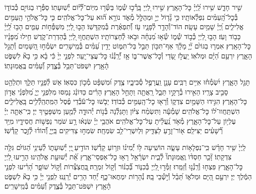 \documentclass[twoside, openany, parskip=half, 11pt]{book}
\begin{document}
שִׁ֣יר חָדָ֑שׁ שִׁ֥ירוּ לַֽ֝יְיָ֗ כׇּל־הָאָֽרֶץ׃
שִׁ֣ירוּ לַ֭יְיָ בָּֽרְ֯כ֣וּ שְׁ֯מ֑וֹ בַּשְּׂ֯ר֥וּ מִיּֽוֹם־לְ֝֯י֗וֹם יְ֯שֽׁוּעָתֽוֹ׃
סַפְּ֯ר֣וּ בַגּוֹיִ֣ם כְּ֯בוֹד֑וֹ בְּ֯כׇל־הָֽ֝עַמִּ֗ים נִפְלְ֯אוֹתָֽיו׃
כִּ֥י גָ֘ד֤וֹל יְיָ֣ וּמְהֻלָּ֣ל מְ֯אֹ֑ד נוֹרָ֥א ה֝֗וּא עַל־כׇּל־אֱלֹהִֽים׃
כִּ֤י כׇּל־אֱלֹהֵ֣י הָֽעַמִּ֣ים אֱלִילִ֑ים וַֽ֝יְיָ֗ שָׁמַ֥יִם עָשָֽׂה׃
הוֹד־וְ֯הָדָ֥ר לְ֯פָנָ֑יו עֹ֥ז וְ֝֯תִפְאֶ֗רֶת בְּ֯מִקְדָּשֽׁוֹ׃
הָב֣וּ לַ֭יְיָ מִשְׁפְּ֯ח֣וֹת עַמִּ֑ים הָב֥וּ לַֽ֝יְיָ֗ כָּב֥וֹד וָעֹֽז׃
הָב֣וּ לַ֭יְיָ כְּ֯ב֣וֹד שְׁ֯מ֑וֹ שְׂ֯א֥וּ מִ֝נְחָ֗ה וּבֹ֥אוּ לְ֯חַצְרוֹתָֽיו׃
הִשְׁתַּֽחֲו֣וּ לַ֭יְיָ בְּ֯הַדְרַת־קֹ֑דֶשׁ חִ֥ילוּ מִ֝פָּנָ֗יו כׇּל־הָאָֽרֶץ׃
אִמְר֤וּ בַגּוֹיִ֨ם יְ֘יָ֤ מָלָ֗ךְ אַף־תִּכּ֣וֹן תֵּבֵ֣ל בַּל־תִּמּ֑וֹט יָדִ֥ין עַ֝מִּ֗ים בְּ֯מֵֽישָׁרִֽים׃
יִשְׂמְ֯ח֣וּ הַ֭שָּׁמַיִם וְ֯תָגֵ֣ל הָאָ֑רֶץ יִרְעַ֥ם הַ֝יָּ֗ם וּמְלֹאֽוֹ׃
יַֽעֲלֹ֣ז שָׂ֭דַי וְ֯כׇל־אֲשֶׁר־בּ֑וֹ אָ֥ז יְ֝֯רַֽנְ֯נ֗וּ כׇּל־עֲצֵי־יָֽעַר׃
לִפְנֵ֤י יְיָ֨ כִּ֬י בָ֗א כִּ֥י בָא֘ לִשְׁפֹּ֢ט הָ֫אָ֥רֶץ יִשְׁפֹּט־תֵּבֵ֥ל בְּ֯צֶ֑דֶק וְ֝֯עַמִּ֗ים בֶּֽאֱמֽוּנָתֽוֹ׃

תָּגֵ֣ל הָאָ֑רֶץ יִ֝שְׂמְ֯ח֗וּ אִיִּ֥ים רַבִּֽים׃
עָנָ֣ן וַֽעֲרָפֶ֣ל סְ֯בִיבָ֑יו צֶ֥דֶק וּ֝מִשְׁפָּ֗ט מְ֯כ֣וֹן כִּסְאֽוֹ׃
אֵשׁ לְ֯פָנָ֣יו תֵּלֵ֑ךְ וּתְלַהֵ֖ט סָבִ֣יב צָרָֽיו׃
הֵאִ֣ירוּ בְ֯רָקָ֣יו תֵּבֵ֑ל רָֽאֲתָ֖ה וַתָּחֵ֣ל הָאָֽרֶץ׃
הָרִ֗ים כַּדּוֹנַ֗ג נָמַסּוּ מִלִּפְנֵ֣י יְיָ֑ מִ֝לִּפְנֵ֗י אֲד֣וֹן כׇּל־הָאָֽרֶץ׃
הִגִּ֣ידוּ הַשָּׁמַ֣יִם צִדְק֑וֹ וְ֯רָא֖וּ כׇל־הָֽעַמִּ֣ים כְּ֯בוֹדֽוֹ׃
יֵבֹ֤שׁוּ כׇּל־עֹ֬בְ֯דֵי פֶ֗סֶל הַמִּֽתְהַֽלְ֯לִ֥ים בָּֽאֱלִילִ֑ים הִשְׁתַּֽחֲווּ־ל֝וֹ כׇּל־אֱלֹהִֽים׃
שָׁמְ֯עָ֬ה וַתִּשְׂמַ֨ח צִיּ֗וֹן וַתָּגֵלְ֯נָה בְּ֯נ֣וֹת יְ֯הוּדָ֑ה לְ֯מַ֖עַן מִשְׁפָּטֶ֣יךָ יְיָ׃
כִּֽי־אַתָּ֤ה יְיָ֗ עֶלְי֥וֹן עַל־כׇּל־הָאָ֑רֶץ מְ֯אֹ֥ד נַֽ֝עֲלֵ֗יתָ עַל־כׇּל־אֱלֹהִֽים׃
אֹהֲבֵ֥י יְיָ֗ שִׂנְא֫וּ רָ֥ע שֹׁמֵר נַפְשׁ֣וֹת חֲסִידָ֑יו מִיַּ֥ד רְ֝֯שָׁעִ֗ים יַצִּילֵֽם׃
א֖וֹר־זָרֻ֣עַ לַצַּדִּ֑יק וּֽלְיִשְׁרֵי־לֵ֥ב שִׂמְחָֽה׃
שִׂמְח֣וּ צַדִּיקִים בַּֽיְיָ֑ וְ֝֯הוֹד֗וּ לְ֯זֵ֣כֶר קָדְ֯שֽׁוֹ׃


לַֽיְיָ֙ שִׁ֥יר חָדָ֗שׁ כִּֽי־נִפְלָא֥וֹת עָשָׂ֑ה הוֹשִֽׁיעָה לּ֥וֹ יְ֝֯מִינ֗וֹ וּזְר֥וֹעַ קָדְ֯שֽׁוֹ׃
הוֹדִ֣יעַ ֖יְיָ יְ֯שֽׁוּעָת֑וֹ לְ֯עֵינֵ֥י הַ֝גּוֹיִ֗ם גִּלָּ֥ה צִדְקָתֽוֹ׃
זָ֘כַ֤ר חַסְדּ֨וֹ וֶֽאֱמֽוּנָתוֹ֘ לְ֯בֵ֢ית יִשְׂרָ֫אֵ֥ל רָא֥וּ כׇל־אַפְסֵי־אָ֑רֶץ אֵ֝֗ת יְ֯שׁוּעַ֥ת אֱלֹהֵֽינוּ׃
הָרִ֣יעוּ לַ֭יְיָ כׇּל־הָאָ֑רֶץ פִּצְח֖וּ וְ֯רַֽנְ֯נ֣וּ וְ֯זַמֵּֽרוּ׃
זַמְּ֯ר֣וּ ֖לַיְיָ בְּ֯כִנּ֑וֹר בְּ֝֯כִנּ֗וֹר וְ֯ק֣וֹל זִמְרָֽה׃
֖בַּֽחֲצֹֽצְ֯רוֹת וְ֯ק֣וֹל שׁוֹפָ֑ר הָ֝רִ֗יעוּ לִפְנֵ֤י הַמֶּ֬לֶךְ יְיָ׃
יִרְעַ֣ם הַ֭יָּם וּמְלֹא֑וֹ תֵּ֝בֵ֗ל וְ֯י֣שְׁ֯בֵי בָֽהּ׃
נְ֯הָר֥וֹת יִמְחֲאוּ־כָ֑ף יַ֝֗חַד הָרִ֥ים יְ֯רַנֵּֽנוּ׃
לִֽפְנֵ֥י יְיָ֗ כִּ֥י בָא֘ לִשְׁפֹּ֢ט הָ֫אָ֥רֶץ יִשְׁפֹּט־תֵּבֵ֥ל בְּ֯צֶ֑דֶק וְ֝֯עַמִּ֗ים בְּ֯מֵֽישָׁרִֽים׃
\end{document}
